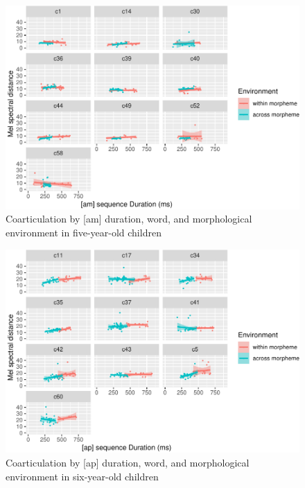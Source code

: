 \documentclass[
]{article}
\begin{document}
\begin{figure}
\centering
\includegraphics{3_ch3_results_files/figure-latex/five-facet-am-1.pdf}
\caption{\label{fig:five-facet-am}Coarticulation by {[}am{]} duration, word, and morphological environment in five-year-old children}
\end{figure}

\begin{figure}
\centering
\includegraphics{3_ch3_results_files/figure-latex/six-facet-ap-1.pdf}
\caption{\label{fig:six-facet-ap}Coarticulation by {[}ap{]} duration, word, and morphological environment in six-year-old children}
\end{figure}
\end{document}

